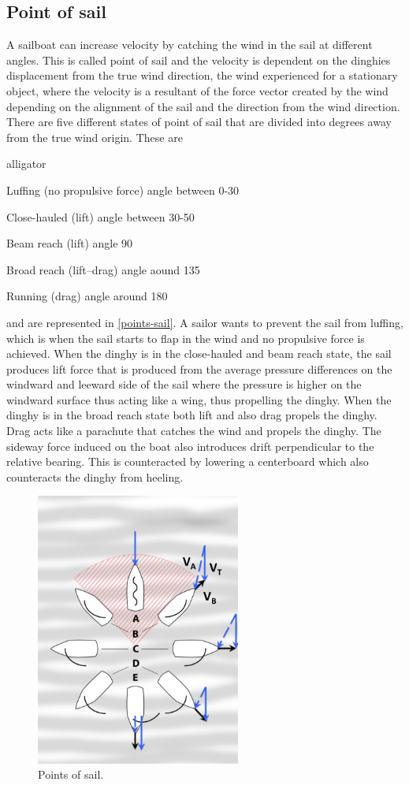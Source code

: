 \subsection{Point of sail}
A sailboat can increase velocity by catching the wind in the sail at different angles. This is called point of sail and the velocity is dependent on the dinghies displacement from the true wind direction, the wind experienced for a stationary object, where the velocity is a resultant of the force vector created by the wind depending on the alignment of the sail and the direction from the wind direction. There are five different states of point of sail that are divided into degrees away from the true wind origin. These are
\begin{labeling}{alligator}
\item [Luffing] (no propulsive force) angle between 0-30\degree
\item [Close-hauled] (lift) angle between 30-50\degree
\item [Beam reach] (lift) angle 90\degree
\item [Broad reach] (lift–drag) angle aound 135\degree
\item [Running] (drag) angle around 180\degree
\end{labeling}
and are represented in \autoref{points-sail}. A sailor wants to prevent the sail from luffing, which is when the sail starts to flap in the wind and no propulsive force is achieved. When the dinghy is in the close-hauled and beam reach state, the sail produces lift force that is produced from the average pressure differences on the windward and leeward side of the sail where the pressure is higher on the windward surface thus acting like a wing, thus propelling the dinghy. When the dinghy is in the broad reach state both lift and also drag propels the dinghy. Drag acts like a parachute that catches the wind and propels the dinghy. The sideway force induced on the boat also introduces drift perpendicular to the relative bearing. This is counteracted by lowering a centerboard which also counteracts the dinghy from heeling.
\begin{figure}[H]
\centering
\includegraphics[width=0.6\textwidth]{Figures/Points_of_sail.jpg}
\caption{Points of sail.}
\label{points-sail}
\end{figure}
